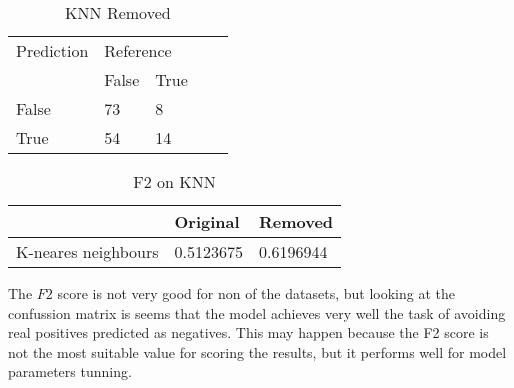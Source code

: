 \begin{table}[!htbp]
\centering
\caption{KNN Removed}
\vspace{0.1cm}
\label{knn-remov}
\begin{tabular}{|l|ll|ll}
\cline{1-3}
Prediction & \multicolumn{2}{l|}{Reference} &  &  \\
           & False          & True          &  &  \\ \cline{2-3}
False      & 73              & 8             &  &  \\
True       & 54              & 14             &  &  \\ \cline{1-3}
\end{tabular}
\end{table}

\begin{table}[!htbp]
\centering
\caption{F2 on KNN}
\vspace{0.1cm}
\label{knn-f2}
\begin{tabular}{|l|l|l|}
\hline
      & Original & Removed \\ \hline
K-neares neighbours & 0.5123675 & 0.6196944          \\ \hline
\end{tabular}
\end{table}


The $F2$ score is not very good for non of the datasets, but looking at the confussion matrix is seems that the model achieves very well the task of avoiding real positives predicted as negatives. This may happen because the F2 score is not the most suitable value for scoring the results, but it performs well for model parameters tunning.


